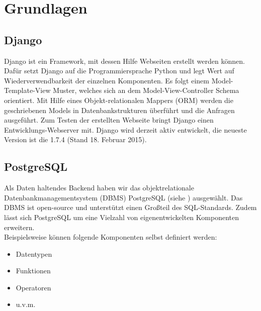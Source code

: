 \chapter{Grundlagen}
\section{Django}
\label{Django}
Django ist ein Framework, mit dessen Hilfe Webseiten erstellt werden können. Dafür setzt Django auf die Programmiersprache Python und legt Wert auf Wiederverwendbarkeit der einzelnen Komponenten. Es folgt einem Model-Template-View Muster, welches sich an dem Model-View-Controller Schema orientiert. Mit Hilfe eines Objekt-relationalen Mappers (ORM) werden die geschriebenen Models in Datenbankstrukturen überführt und die Anfragen ausgeführt. Zum Testen der erstellten Webseite bringt Django einen Entwicklungs-Webserver mit. Django wird derzeit aktiv entwickelt, die neueste Version ist die 1.7.4 (Stand 18. Februar 2015).

\section{PostgreSQL}
Als Daten haltendes Backend haben wir das objektrelationale Datenbankmanagementsystem (DBMS) PostgreSQL (siehe \cite{PostgreSQL2015}) ausgewählt. Das DBMS ist open-source und unterstützt einen Großteil des SQL-Standards. Zudem lässt sich PostgreSQL um eine Vielzahl von eigenentwickelten Komponenten erweitern.\\

\noindent Beispielsweise können folgende Komponenten selbst definiert werden:
\begin{itemize}
\item Datentypen
\item Funktionen
\item Operatoren 
\item u.v.m.
\end{itemize}